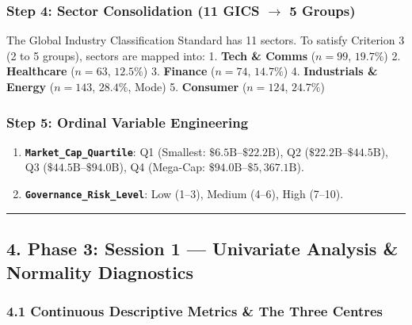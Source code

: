 \documentclass[
]{article}
\providecommand{\tightlist}{%
  \setlength{\itemsep}{0pt}\setlength{\parskip}{0pt}}
\begin{document}
\subsubsection{\texorpdfstring{Step 4: Sector Consolidation (11 GICS
\(\rightarrow\) 5
Groups)}{Step 4: Sector Consolidation (11 GICS \textbackslash rightarrow 5 Groups)}}\label{step-4-sector-consolidation-11-gics-rightarrow-5-groups}

The Global Industry Classification Standard has 11 sectors. To satisfy
Criterion 3 (2 to 5 groups), sectors are mapped into: 1. \textbf{Tech \&
Comms} (\(n = 99\), \(19.7\%\)) 2. \textbf{Healthcare} (\(n = 63\),
\(12.5\%\)) 3. \textbf{Finance} (\(n = 74\), \(14.7\%\)) 4.
\textbf{Industrials \& Energy} (\(n = 143\), \(28.4\%\), Mode) 5.
\textbf{Consumer} (\(n = 124\), \(24.7\%\))

\subsubsection{Step 5: Ordinal Variable
Engineering}\label{step-5-ordinal-variable-engineering}

\begin{enumerate}
\def\labelenumi{\arabic{enumi}.}
\tightlist
\item
  \textbf{\texttt{Market\_Cap\_Quartile}}: Q1 (Smallest:
  \(\$6.5\text{B}–\$22.2\text{B}\)), Q2
  (\(\$22.2\text{B}–\$44.5\text{B}\)), Q3
  (\(\$44.5\text{B}–\$94.0\text{B}\)), Q4 (Mega-Cap:
  \(\$94.0\text{B}–\$5,367.1\text{B}\)).
\item
  \textbf{\texttt{Governance\_Risk\_Level}}: Low (1--3), Medium (4--6),
  High (7--10).
\end{enumerate}

\begin{center}\rule{0.5\linewidth}{0.5pt}\end{center}

\subsection{4. Phase 3: Session 1 --- Univariate Analysis \& Normality
Diagnostics}\label{phase-3-session-1-univariate-analysis-normality-diagnostics}

\subsubsection{4.1 Continuous Descriptive Metrics \& The Three
Centres}\label{continuous-descriptive-metrics-the-three-centres}
\end{document}
